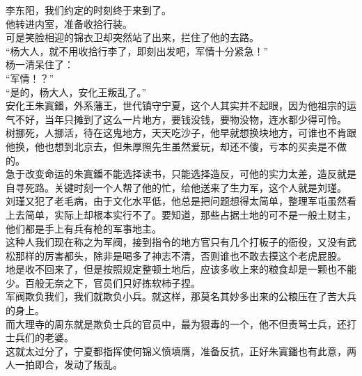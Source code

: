 \begin{multicols}{\theparacolNo}
李东阳，我们约定的时刻终于来到了。\\

他转进内室，准备收拾行装。\\

可是笑脸相迎的锦衣卫却突然站了出来，拦住了他的去路。\\

“杨大人，就不用收拾行李了，即刻出发吧，军情十分紧急！”\\

杨一清呆住了：\\

“军情！？”\\

“是的，杨大人，安化王叛乱了。”\\

安化王朱寘鐇，外系藩王，世代镇守宁夏，这个人其实并不起眼，因为他祖宗的运气不好，当年只摊到了这么一片地方，要钱没钱，要物没物，连水都少得可怜。\\

树挪死，人挪活，待在这鬼地方，天天吃沙子，他早就想换块地方，可谁也不肯跟他换，他也想到北京去，但朱厚照先生虽然爱玩，却还不傻，亏本的买卖是不做的。\\

急于改变命运的朱寘鐇不能选择读书，只能选择造反，可他的实力太差，造反就是自寻死路。关键时刻一个人帮了他的忙，给他送来了生力军，这个人就是刘瑾。\\

刘瑾又犯了老毛病，由于文化水平低，他总是把问题想得太简单，整理军屯虽然看上去简单，实际上却根本实行不了。要知道，那些占据土地的可不是一般土财主，他们都是手上有兵有枪的军事地主。\\

这种人我们现在称之为军阀，接到指令的地方官只有几个打板子的衙役，又没有武松那样的厉害都头，除非是喝多了神志不清，否则谁也不敢去摸这个老虎屁股。\\

地是收不回来了，但是按照规定整顿土地后，应该多收上来的粮食却是一颗也不能少。百般无奈之下，官员们只好拣软柿子捏。\\

军阀欺负我们，我们就欺负小兵。就这样，那莫名其妙多出来的公粮压在了苦大兵的身上。\\

而大理寺的周东就是欺负士兵的官员中，最为狠毒的一个，他不但责骂士兵，还打士兵们的老婆。\\

这就太过分了，宁夏都指挥使何锦义愤填膺，准备反抗，正好朱寘鐇也有此意，两人一拍即合，发动了叛乱。\\


\end{multicols}
